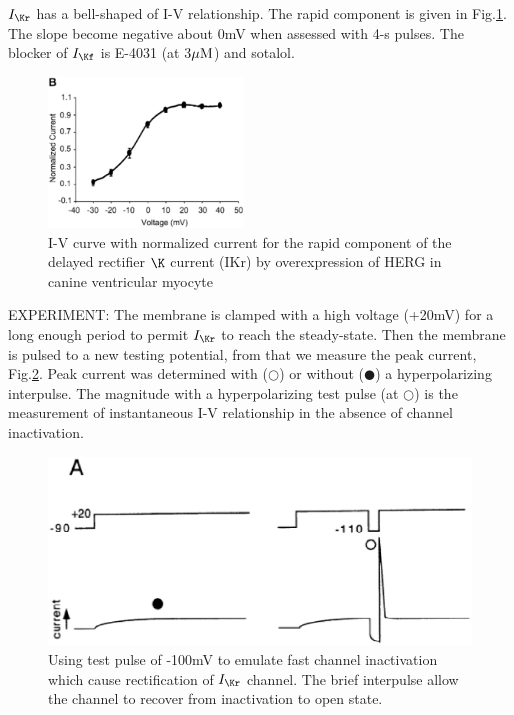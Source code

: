 $I_\Kr$ has a bell-shaped of I-V relationship. The rapid component is given in
Fig.\ref{fig:IVcurve-IKr}. The slope become negative about 0mV when assessed
with 4-s pulses. The blocker of $I_\Kf$ is E-4031 (at 3${\mu\text{M}}$) and sotalol.

 
\begin{figure}[hbt]
  \centerline{\includegraphics[height=4cm,
    angle=0]{./images/IVcurve_IKr.eps}}
\caption{I-V curve with normalized current for the rapid component of the
delayed rectifier $\K$ current (IKr) by overexpression of HERG in canine
ventricular myocyte \citep{hua2004}}
\label{fig:IVcurve-IKr}
\end{figure}

EXPERIMENT: The membrane is clamped with a high voltage (+20mV) for a long
enough period to permit $I_\Kr$ to reach the steady-state.
Then the membrane is pulsed to a new testing potential, from that we measure the
peak current, Fig.\ref{fig:IKr_peakcurrent}. Peak current was determined with
($\Circle$) or without ($\CIRCLE$) a hyperpolarizing interpulse. The magnitude
with a hyperpolarizing test pulse (at $\Circle$) is the measurement of
instantaneous I-V relationship in the absence of channel inactivation.

\begin{figure}[hbt]
  \centerline{\includegraphics[height=5cm,
    angle=0]{./images/IKr_Sanguinetti1997.eps}}
  \caption{Using test pulse of -100mV to emulate fast channel inactivation
  which cause rectification of $I_\Kr$ channel. The brief interpulse allow the
  channel to recover from inactivation to open state.}
  \label{fig:IKr_peakcurrent}
\end{figure}

